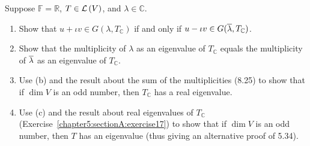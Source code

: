 \begin{exercise}\label{chapter8:sectionB:exercise23}
    Suppose $\mathbb{F} = \mathbb{R}$, $T\in\mathcal{L}\left({V}\right)$, and $\lambda\in\mathbb{C}$.
    \begin{enumerate}[label={(\alph*)}]
        \item Show that $u + \iota v\in G(\lambda, T_{\mathbb{C}})$ if and only if $u - \iota v\in G(\overline{\lambda}, T_{\mathbb{C}})$.
        \item Show that the multiplicity of $\lambda$ as an eigenvalue of $T_{\mathbb{C}}$ equals the multiplicity of $\overline{\lambda}$ as an eigenvalue of $T_{\mathbb{C}}$.
        \item Use (b) and the result about the sum of the multiplicities (8.25) to show that if $\dim V$ is an odd number, then $T_{\mathbb{C}}$ has a real eigenvalue.
        \item Use (c) and the result about real eigenvalues of $T_{\mathbb{C}}$ (Exercise~\ref{chapter5:sectionA:exercise17}) to show that if $\dim V$ is an odd number, then $T$ has an eigenvalue (thus giving an alternative proof of 5.34).
    \end{enumerate}
\end{exercise}

